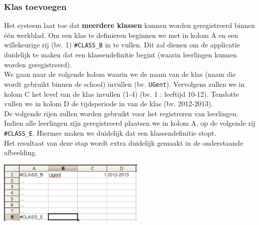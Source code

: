 \begin{section}
\subsubsection{Klas toevoegen}
Het systeem laat toe dat \textbf{meerdere klassen} kunnen worden geregistreerd binnen één werkblad. Om een klas te definieren beginnen we met in kolom A en een willekeurige rij (bv. 1) \texttt{\#CLASS\_B} in te vullen. Dit zal dienen om de applicatie duidelijk te maken dat een klassendefinitie begint (waarin leerlingen kunnen worden geregistreerd).\\
We gaan naar de volgende kolom waarin we de naam van de klas (naam die wordt gebruikt binnen de school) invullen (bv. \texttt{UGent}). Vervolgens zullen we in kolom C het level van de klas invullen (1-4) (bv. 1 : leeftijd 10-12). Tenslotte vullen we in kolom D de tijdsperiode in van de klas (bv. 2012-2013).\\
De volgende rijen zullen worden gebruikt voor het registreren van leerlingen. Indien alle leerlingen zijn geregistreerd plaatsen we in kolom A, op de volgende rij \texttt{\#CLASS\_E}. Hiermee maken we duidelijk dat een klassendefinitie stopt.\\
Het resultaat van deze stap wordt extra duidelijk gemaakt in de onderstaande afbeelding. 
\begin{center}
\includegraphics[height=3cm]{img/klas.png}
\end{center}

\end{section}
